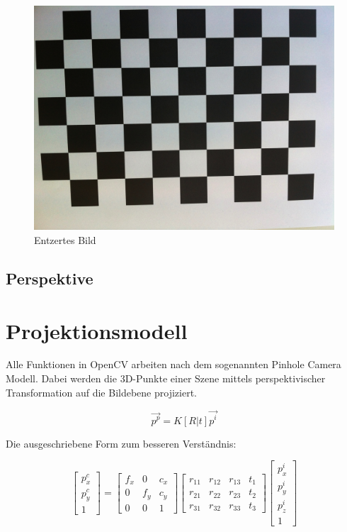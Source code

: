 \begin{figure}[!ht]
\centering
\includegraphics[scale=0.1]{images/chessboard-undisorted.jpg} 
\caption{Entzertes Bild}
\label{fig:chessboard-undisorted}
\end{figure}

\subsection{Perspektive}

\section{Projektionsmodell}
Alle Funktionen in OpenCV arbeiten nach dem sogenannten Pinhole Camera Modell. Dabei werden die 3D-Punkte einer Szene mittels perspektivischer Transformation auf die Bildebene projiziert.

\begin{equation}
\vec{p^p} = K [R|t] \vec{p^i}
\end{equation}

Die ausgeschriebene Form zum besseren Verständnis:

\begin{equation}
\begin{bmatrix}	
p^c_x \\ p^c_y \\ 1
\end{bmatrix} 
=
\begin{bmatrix}
f_x & 0 & c_x \\
0 & f_y & c_y \\
0 & 0 & 1
\end{bmatrix} 
\begin{bmatrix}
r_{11} & r_{12} & r_{13} & t_1 \\
r_{21} & r_{22} & r_{23} & t_2 \\
r_{31} & r_{32} & r_{33} & t_3
\end{bmatrix} 
\begin{bmatrix}
p^i_x \\ p^i_y \\ p^i_z \\ 1
\end{bmatrix} 
\end{equation}

